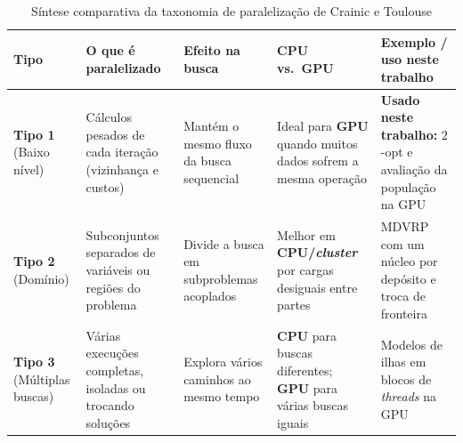 \begin{table}[htbp]
      \centering
      \caption{Síntese comparativa da taxonomia de paralelização de Crainic e Toulouse}\label{tbl:crainic-taxonomy}
      \begin{tabeladensa}
            \begin{tabular}{@{}
                        >{\raggedright\arraybackslash}p{}
                        >{\raggedright\arraybackslash}p{}
                        >{\raggedright\arraybackslash}p{}
                        >{\raggedright\arraybackslash}p{}
                        >{\raggedright\arraybackslash}p{}@{}}
                  \toprule
                  Tipo                                                                        & O que é paralelizado & Efeito na busca & CPU vs.\ GPU & Exemplo / uso neste trabalho \\
                  \midrule
                  \textbf{Tipo 1} (Baixo nível)                                               &
                  Cálculos pesados de cada iteração (vizinhança e custos)                     &
                  Mantém o mesmo fluxo da busca sequencial                                    &
                  Ideal para \textbf{GPU} quando muitos dados sofrem a mesma operação         &
                  \textbf{Usado neste trabalho:} \(2\)-opt e avaliação da população na GPU \autocite{tsp_gpu}                                                                        \\
                  \addlinespace[4pt]
                  \textbf{Tipo 2} (Domínio)                                                   &
                  Subconjuntos separados de variáveis ou regiões do problema                  &
                  Divide a busca em subproblemas acoplados                                    &
                  Melhor em \textbf{CPU/\emph{cluster}} por cargas desiguais entre partes     &
                  MDVRP com um núcleo por depósito e troca de fronteira \autocites{crainic2010parallel}{simchi2005logic}                                                             \\
                  \addlinespace[4pt]
                  \textbf{Tipo 3} (Múltiplas buscas)                                          &
                  Várias execuções completas, isoladas ou trocando soluções                   &
                  Explora vários caminhos ao mesmo tempo                                      &
                  \textbf{CPU} para buscas diferentes; \textbf{GPU} para várias buscas iguais &
                  Modelos de ilhas em blocos de \emph{threads} na GPU \autocites{luong2013gpu}{schulz2013gpu}                                                                        \\
                  \bottomrule
            \end{tabular}
      \end{tabeladensa}
\end{table}

